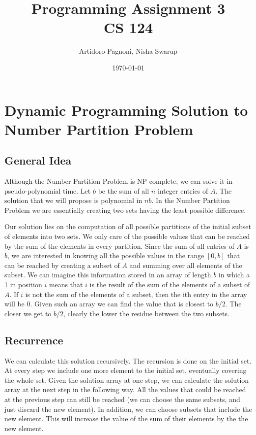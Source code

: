 \documentclass[11pt]{article}
\begin{document}
\title{Programming Assignment 3\\
CS 124}
\author{Artidoro Pagnoni, Nisha Swarup}
\date{\today}
\maketitle


\section{Dynamic Programming Solution to Number Partition Problem}
\subsection{General Idea}
Although the Number Partition Problem is NP complete, we can solve it in pseudo-polynomial time. Let $b$ be the sum of all $n$ integer entries of $A$. The solution that we will propose is polynomial in $nb$. In the Number Partition Problem we are essentially creating two sets having the least possible difference. 

Our solution lies on the computation of all possible partitions of the initial subset of elements into two sets. We only care of the possible values that can be reached by the sum of the elements in every partition. Since the sum of all entries of $A$ is $b$, we are interested in knowing all the possible values in the range $[0,b]$ that can be reached by creating a subset of $A$ and summing over all elements of the subset. We can imagine this information stored in an array of length $b$ in which a 1 in position $i$ means that $i$ is the result of the sum of the elements of a subset of $A$. If $i$ is not the sum of the elements of a subset, then the ith entry in the array will be 0.  Given such an array we can find the value that is closest to $b/2$. The closer we get to $b/2$, clearly the lower the residue between the two subsets. 

\subsection{Recurrence}
We can calculate this solution recursively. The recursion is done on the initial set. At every step we include one more element to the initial set, eventually covering the whole set. Given the solution array at one step, we can calculate the solution array at the next step in the following way. All the values that could be reached at the previous step can still be reached (we can choose the same subsets, and just discard the new element). In addition, we can choose subsets that include the new element. This will increase the value of the sum of their elements by the the new element. 
\end{document}
